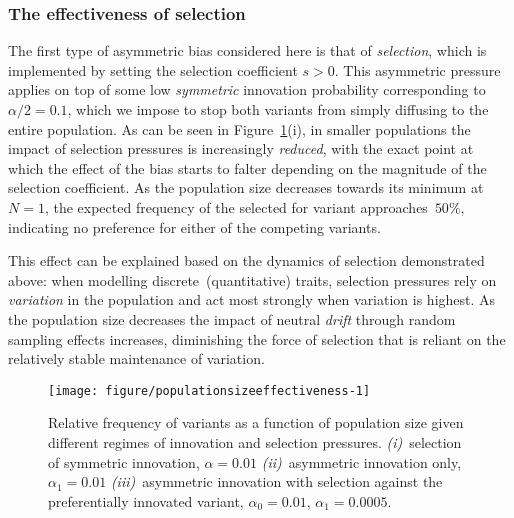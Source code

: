\subsubsection{The effectiveness of selection}

The first type of asymmetric bias considered here is that of \emph{selection}, which is implemented by setting the selection coefficient $s>0$. This asymmetric pressure applies on top of some low \emph{symmetric} innovation probability corresponding to~$\alpha/2=0.1$, which we impose to stop both variants from simply diffusing to the entire population.
As can be seen in Figure~\ref{fig:populationsizeeffectiveness}(i), in smaller populations the impact of selection pressures is increasingly \emph{reduced}, with the exact point at which the effect of the bias starts to falter depending on the magnitude of the selection coefficient. As the population size decreases towards its minimum at~$N=1$, the expected frequency of the selected for variant approaches~$50\%$, indicating no preference for either of the competing variants.

This effect can be explained based on the dynamics of selection demonstrated above: when modelling discrete~(quantitative) traits, selection pressures rely on \emph{variation} in the population and act most strongly when variation is highest. As the population size decreases the impact of neutral \emph{drift} through random sampling effects increases, diminishing the force of selection that is reliant on the relatively stable maintenance of variation.


\begin{knitrout}
\color{fgcolor}

\begin{figure}[htbp]

{\centering \texttt{[image: figure/populationsizeeffectiveness-1]} 

}

\caption[Relative frequency of variants as a function of population size given different regimes of innovation and selection pressures]{Relative frequency of variants as a function of population size given different regimes of innovation and selection pressures. \emph{(i)}~selection of symmetric innovation, $\alpha=0.01$ \emph{(ii)}~asymmetric innovation only, $\alpha_1=0.01$ \emph{(iii)}~asymmetric innovation with selection against the preferentially innovated variant, $\alpha_0=0.01$, $\alpha_1=0.0005$.}\label{fig:populationsizeeffectiveness}
\end{figure}


\end{knitrout}

